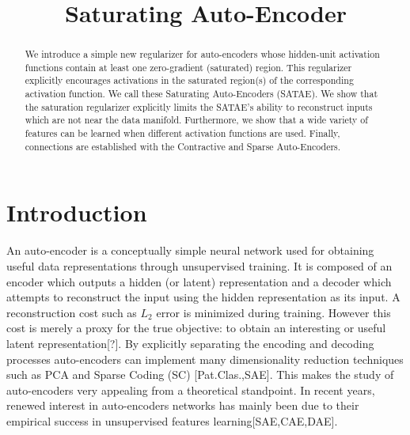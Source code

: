 \documentclass{article} %
\begin{document}
\title{Saturating Auto-Encoder} 
\date{} 
\maketitle


\begin{abstract} 
We introduce a simple new regularizer for auto-encoders whose hidden-unit
activation functions contain at least one zero-gradient (saturated) region.
This regularizer explicitly encourages activations in the saturated region(s)
of the corresponding activation function. We call these Saturating
Auto-Encoders (SATAE). We show that the saturation regularizer explicitly
limits the SATAE's ability to reconstruct inputs which are not near the data
manifold. Furthermore, we show that a wide variety of features can be learned
when different activation functions are used. Finally, connections are
established with the Contractive and Sparse Auto-Encoders.    

\end{abstract} 
\section{Introduction} 
An auto-encoder is a conceptually simple neural network used for obtaining
useful data representations through unsupervised training. It is composed of an
encoder which outputs a hidden (or latent) representation and a decoder which
attempts to reconstruct the input using the hidden representation as its input.
A reconstruction cost such as $L_2$ error is minimized during training. However
this cost is merely a proxy for the true objective: to obtain an interesting or
useful latent representation[?]. By explicitly separating the encoding and
decoding processes auto-encoders can  implement many dimensionality reduction
techniques such as PCA and Sparse Coding (SC) [Pat.Clas.,SAE]. This makes the
study of auto-encoders very appealing from a theoretical standpoint. In recent
years, renewed interest in auto-encoders networks has mainly been due to their
empirical success in unsupervised features learning[SAE,CAE,DAE]. \\
\end{document}
